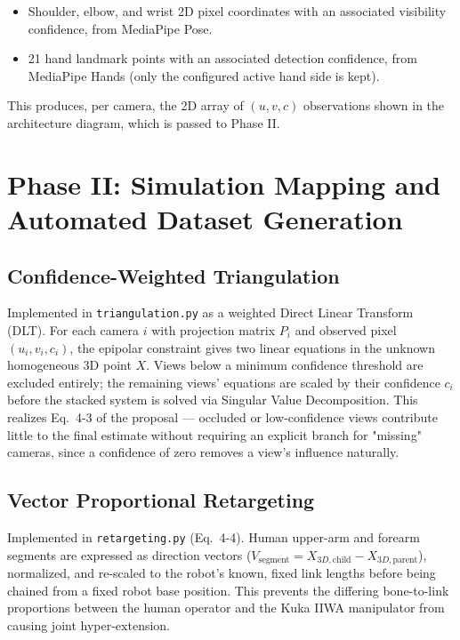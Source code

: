 \begin{itemize}
    \item Shoulder, elbow, and wrist 2D pixel coordinates with an
    associated visibility confidence, from MediaPipe Pose.
    \item 21 hand landmark points with an associated detection confidence,
    from MediaPipe Hands (only the configured active hand side is kept).
\end{itemize}

This produces, per camera, the 2D array of $(u, v, c)$ observations shown
in the architecture diagram, which is passed to Phase II.

\section{Phase II: Simulation Mapping and Automated Dataset Generation}

\subsection{Confidence-Weighted Triangulation}

Implemented in \texttt{triangulation.py} as a weighted Direct Linear
Transform (DLT). For each camera $i$ with projection matrix $P_i$ and
observed pixel $(u_i, v_i, c_i)$, the epipolar constraint gives two linear
equations in the unknown homogeneous 3D point $X$. Views below a minimum
confidence threshold are excluded entirely; the remaining views' equations
are scaled by their confidence $c_i$ before the stacked system is solved
via Singular Value Decomposition. This realizes Eq.~4-3 of the proposal —
occluded or low-confidence views contribute little to the final estimate
without requiring an explicit branch for "missing" cameras, since a
confidence of zero removes a view's influence naturally.

\subsection{Vector Proportional Retargeting}

Implemented in \texttt{retargeting.py} (Eq.~4-4). Human upper-arm and
forearm segments are expressed as direction vectors
($V_{\text{segment}} = X_{3D,\text{child}} - X_{3D,\text{parent}}$),
normalized, and re-scaled to the robot's known, fixed link lengths before
being chained from a fixed robot base position. This prevents the
differing bone-to-link proportions between the human operator and the
Kuka IIWA manipulator from causing joint hyper-extension.

